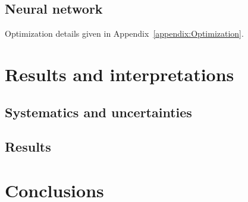\documentclass[a4paper, 10pt, openright]{report}
\begin{document}
\section{Neural network} \label{section:NN}


Optimization details given in Appendix~\ref{appendix:Optimization}.


























\chapter{Results and interpretations} \label{chapter:FinalResults}
\section{Systematics and uncertainties} \label{section:Systematics}
\section{Results}































\chapter{Conclusions} \label{chapter:Conclusion}
\end{document}
